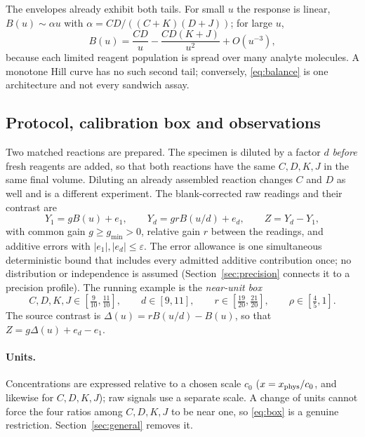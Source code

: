 \documentclass[11pt]{article}
\theoremstyle{plain}
\theoremstyle{definition}
\numberwithin{equation}{section}
\newcommand{\eps}{\varepsilon}
\newcommand{\gmin}{g_{\min}}
\begin{document}
The envelopes already exhibit both tails. For small $u$ the response is linear,
$B(u)\sim\alpha u$ with $\alpha=CD/((C+K)(D+J))$; for large $u$,
\begin{equation}\label{eq:tailexp}
 B(u)=\frac{CD}{u}-\frac{CD(K+J)}{u^2}+O(u^{-3}),
\end{equation}
because each limited reagent population is spread over many analyte molecules.
A monotone Hill curve has no such second tail; conversely, \eqref{eq:balance} is one
architecture and not every sandwich assay.

\subsection{Protocol, calibration box and observations}
Two matched reactions are prepared. The specimen is diluted by a factor $d$
\emph{before} fresh reagents are added, so that both reactions have the same
$C,D,K,J$ in the same final volume. Diluting an already assembled reaction changes
$C$ and $D$ as well and is a different experiment. The blank-corrected raw readings
and their contrast are
\begin{equation}\label{eq:obs}
 Y_1=gB(u)+e_1,\qquad Y_d=grB(u/d)+e_d,\qquad Z=Y_d-Y_1 ,
\end{equation}
with common gain $g\ge\gmin>0$, relative gain $r$ between the readings, and
additive errors with $|e_1|,|e_d|\le\eps$. The error allowance is one simultaneous
deterministic bound that includes every admitted additive contribution once; no
distribution or independence is assumed (Section~\ref{sec:precision} connects it to
a precision profile). The running example is the \emph{near-unit box}
\begin{equation}\label{eq:box}
 C,D,K,J\in[\tfrac9{10},\tfrac{11}{10}],\qquad d\in[9,11],\qquad
 r\in[\tfrac{19}{20},\tfrac{21}{20}],\qquad \rho\in[\tfrac45,1].
\end{equation}
The source contrast is $\Delta(u)=rB(u/d)-B(u)$, so that $Z=g\Delta(u)+e_d-e_1$.

\paragraph{Units.} Concentrations are expressed relative to a chosen scale $c_0$
($x=x_{\rm phys}/c_0$, and likewise for $C,D,K,J$); raw signals use a separate
scale. A change of units cannot force the four ratios among $C,D,K,J$ to be near
one, so \eqref{eq:box} is a genuine restriction. Section~\ref{sec:general} removes it.
\end{document}
